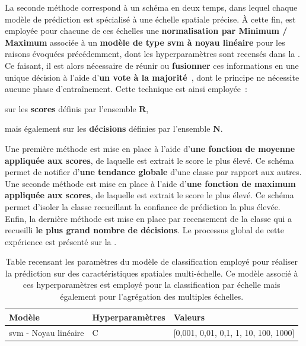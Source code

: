 La seconde méthode correspond à un schéma en deux temps, dans lequel chaque modèle de prédiction est spécialisé à une échelle spatiale précise. À cette fin, est employée pour chacune de ces échelles une \textbf{normalisation par Minimum / Maximum} associée à un \textbf{modèle de type \gls{svm} à noyau linéaire} pour les raisons évoquées précédemment, dont les hyperparamètres sont recensés dans la . Ce faisant, il est alors nécessaire de réunir ou \textbf{fusionner} ces informations en une unique décision à l'aide d'\textbf{un vote à la majorité}~\cite{TinKamHo1994,Lam1997}, dont le principe ne nécessite aucune phase d'entraînement. Cette technique est ainsi employée~:
\begin{inlinerate}
    \item sur les \textbf{scores} définis par l'ensemble $\mathbf{R}$,
    \item mais également sur les \textbf{décisions} définies par l'ensemble $\mathbf{N}$.
\end{inlinerate} Une première méthode est mise en place à l'aide d'\textbf{une fonction de moyenne appliquée aux scores}, de laquelle est extrait le score le plus élevé. Ce schéma permet de notifier d'\textbf{une tendance globale} d'une classe par rapport aux autres. Une seconde méthode est mise en place à l'aide d'\textbf{une fonction de maximum appliquée aux scores}, de laquelle est extrait le score le plus élevé. Ce schéma permet d'isoler la classe recueillant la confiance de prédiction la plus élevée. Enfin, la dernière méthode est mise en place par recensement de la classe qui a recueilli \textbf{le plus grand nombre de décisions}. Le processus global de cette expérience est présenté sur la .\par

\begin{table}[H]
    \centering
    \begin{tabular}{lll}
        \toprule
        \textbf{Modèle}                                 & \textbf{Hyperparamètres}  & \textbf{Valeurs}                          \\ \midrule
        \gls{svm} - Noyau linéaire                      & C                         & [0,001, 0,01, 0,1, 1, 10, 100, 1000]      \\ 
        \bottomrule 
    \end{tabular} 
    \caption{Table recensant les paramètres du modèle de classification employé pour réaliser la prédiction sur des caractéristiques spatiales multi-échelle. Ce modèle associé à ces hyperparamètres est employé pour la classification par échelle mais également pour l'agrégation des multiples échelles.}
    \label{tab:parameters_image_improvement_models_multiscale_spatial}
\end{table}\par

